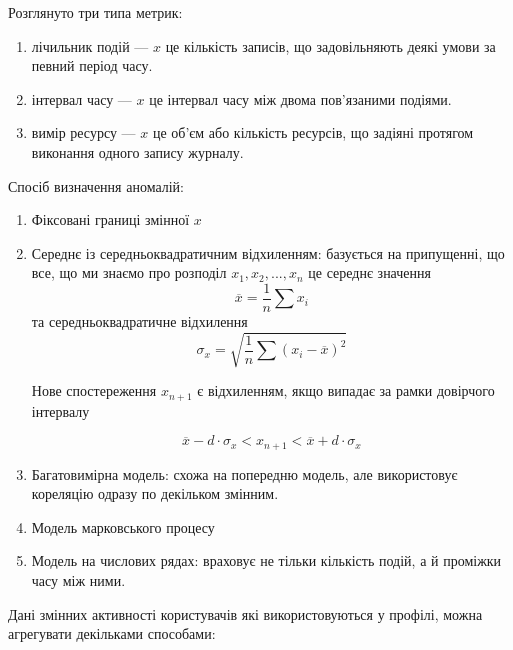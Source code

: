 Розглянуто три типа метрик:

\begin{enumerate}
  \item лічильник подій --- $x$ це кількість записів, що 
        задовільняють деякі умови за певний період часу.
  \item інтервал часу --- $x$ це інтервал часу між двома 
        пов'язаними подіями.
  \item вимір ресурсу --- $x$ це об'єм або кількість ресурсів,
        що задіяні протягом виконання одного запису журналу.
\end{enumerate}

Спосіб визначення аномалій:

\begin{enumerate}
  \item Фіксовані границі змінної $x$
  \item Середнє із середньоквадратичним відхиленням: базується на
        припущенні, що все, що ми знаємо про розподіл
        $x_1, x_2, ..., x_n$ це середнє значення
        \begin{equation}
            \overline{x} = \frac{1}{n} \sum{x_i}
        \end{equation}
        та середньоквадратичне відхилення
        \begin{equation}
            \sigma_x = \sqrt{\frac{1}{n} \sum{(x_i - \overline{x})^2}}
        \end{equation}

        Нове спостереження $x_{n+1}$ є відхиленням, якщо випадає за рамки довірчого інтервалу

        \begin{equation}
            \label{eq:denning_confidence}
            \overline{x} - d \cdot \sigma_x < x_{n+1} < \overline{x} + d \cdot \sigma_x
        \end{equation}

    \item Багатовимірна модель: схожа на попередню модель, але
          використовує кореляцію одразу по декільком змінним.
    \item Модель марковського процесу
    \item Модель на числових рядах: враховує не тільки кількість
          подій, а й проміжки часу між ними.
\end{enumerate}

Дані змінних активності користувачів які використовуються
у профілі, можна агрегувати декільками способами: %

